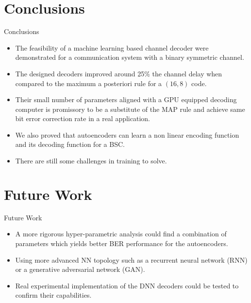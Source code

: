 \documentclass{beamer}
\begin{document}
\section{Conclusions}

\begin{frame}{Conclusions}
  \begin{itemize}
  \item {
    The feasibility of a machine learning based channel decoder were demonstrated for a communication system with a binary symmetric channel.
  }
  \item {
    The designed decoders improved around 25\% the channel delay when compared to the maximum a posteriori rule for a $(16,8)$ code.
  }
  \item{
Their small number of parameters aligned with a GPU equipped decoding computer is promissory to be a substitute of the MAP rule and achieve same bit error correction rate in a real application. \\
  }
  \item{
We also proved that autoencoders can learn a non linear encoding function and its decoding function for a BSC.  
  }
  \item{
   There are still some challenges in training to solve.
  }
  \end{itemize}
\end{frame}

\section{Future Work}
\begin{frame}{Future Work}
  \begin{itemize}
  \item {
    A more rigorous hyper-parametric analysis could find a combination of parameters which yields better BER performance for the autoencoders.
  }
    \item{
  Using more advanced NN topology such as a recurrent neural network (RNN) or a generative adversarial network (GAN).
  }
  \item {
     Real experimental implementation of the DNN decoders could be tested to confirm their capabilities.
  }
  \end{itemize}
\end{frame}
\end{document}
